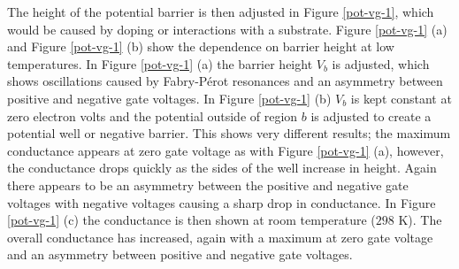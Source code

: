 	The height of the potential barrier is then adjusted in Figure \ref{pot-vg-1}, which would be caused by doping or interactions with a substrate. Figure \ref{pot-vg-1} (a) and Figure \ref{pot-vg-1} (b) show the dependence on barrier height at low temperatures. In Figure \ref{pot-vg-1} (a) the barrier height $V_{b}$ is adjusted, which shows oscillations caused by Fabry-P\'{e}rot resonances and an asymmetry between positive and negative gate voltages. In Figure \ref{pot-vg-1} (b) $V_{b}$ is kept constant at zero electron volts and the potential outside of region $b$ is adjusted to create a potential well or negative barrier. This shows very different results; the maximum conductance appears at zero gate voltage as with Figure \ref{pot-vg-1} (a), however, the conductance drops quickly as the sides of the well increase in height. Again there appears to be an asymmetry between the positive and negative gate voltages with negative voltages causing a sharp drop in conductance. In Figure \ref{pot-vg-1} (c) the conductance is then shown at room temperature ($298$ K). The overall conductance has increased, again with a maximum at zero gate voltage and an asymmetry between positive and negative gate voltages.
